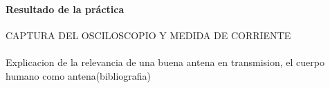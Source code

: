 \paragraph{Resultado de la pr\'actica} CAPTURA DEL OSCILOSCOPIO Y MEDIDA DE CORRIENTE
\paragraph{}
Explicacion de la relevancia de una buena antena en transmision, el cuerpo humano como antena(bibliografia)

% 
% 
